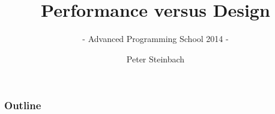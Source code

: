 \documentclass[9pt,xcolor=table]{beamer}
\begin{document}
     
 
 
\title[PerfVsDesign]{Performance versus Design}
\subtitle{- Advanced Programming School 2014 -}
\author[P. Steinbach]{Peter Steinbach}
\date{}
\addtocounter{framenumber}{-1}
\renewcommand*\inserttotalframenumber{XX} 

 
{
\maketitle
}

\begin{frame}[t]
\frametitle{Outline}
\vspace{-1.5\baselineskip}
\begin{columns}[t]
  \begin{column}{.1\textwidth}
    \hfill
  \end{column}
  \begin{column}{.75\textwidth}
    \huge
    \tableofcontents[hideallsubsections]
  \end{column}
  \begin{column}{.1\textwidth}
    \hfill
  \end{column}
\end{columns}
\end{frame}
\end{document}
